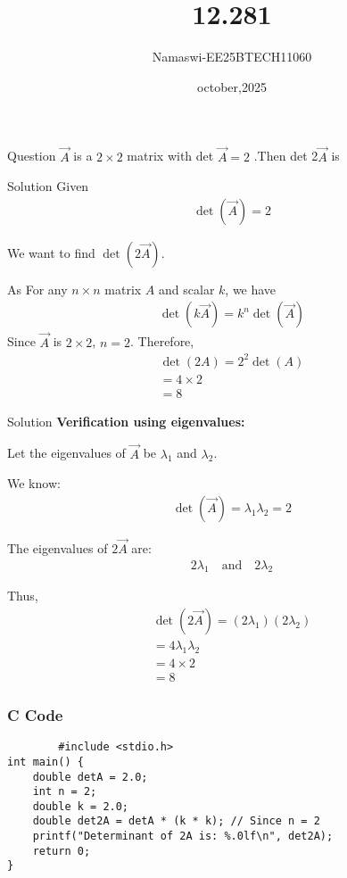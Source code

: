 \documentclass{beamer}
\begin{document}
\title 
{12.281}
\date{october,2025}


\author 
{Namaswi-EE25BTECH11060}
\frame{\titlepage}
\begin{frame}{Question}
$\Vec{A}$ is a $2 \times 2$ matrix with det $\Vec{A}=2$ .Then det 2$\Vec{A}$  is
\end{frame}
\begin{frame}{Solution}
    Given  
\begin{align}
    \det(\Vec{A}) = 2
\end{align}

We want to find \(\det(2\Vec{A})\).

As
For any \( n \times n \) matrix \( A \) and scalar \( k \), we have
\begin{align}
\det(k\Vec{A}) = k^n \det(\Vec{A})
\end{align}
Since \( \Vec{A} \) is \( 2 \times 2 \), \( n = 2 \). Therefore,
\begin{align}
    \det(2A) = 2^2 \det(A) \\= 4 \times 2 \\= 8
\end{align}
\end{frame}
\begin{frame}{Solution}
   \textbf{Verification using eigenvalues:}

Let the eigenvalues of \( \Vec{A} \) be \( \lambda_1 \) and \( \lambda_2 \).

We know:
\begin{align}
\det(\Vec{A}) = \lambda_1 \lambda_2 = 2
\end{align}

The eigenvalues of \( 2\Vec{A} \) are:
\begin{align}
2\lambda_1 \quad \text{and} \quad 2\lambda_2
\end{align}

Thus,
\begin{align}
\det(2\Vec{A}) = (2\lambda_1)(2\lambda_2)\\ = 4 \lambda_1 \lambda_2 \\= 4 \times 2 \\= 8
\end{align}
\end{frame}
\begin{frame}[fragile]
    \frametitle{C Code}
    \begin{lstlisting}
        #include <stdio.h>
int main() {
    double detA = 2.0;
    int n = 2;
    double k = 2.0;
    double det2A = detA * (k * k); // Since n = 2
    printf("Determinant of 2A is: %.0lf\n", det2A);
    return 0;
}
\end{lstlisting}
\end{frame}
\end{document}
